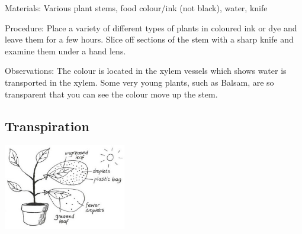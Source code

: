 \begin{multicols}{2}
\begin{description*}
\item[Materials:]{Various plant stems, food colour/ink (not black), water, knife}
\item[Procedure:]{Place a variety of different types of plants in coloured ink or dye and
leave them for a few hours. Slice off sections of the stem with a sharp
knife and examine them under a hand lens. }
\item[Observations:]{The colour is located in the
xylem vessels which shows water is transported in the xylem. Some very young plants, such as
Balsam, are so transparent that
you can see the colour move up
the stem.}
\end{description*}

\subsection{Transpiration}  %

\begin{center}
\includegraphics[width=0.4\textwidth]{./img/vso/transpiration.jpg}
\end{center}


\end{multicols}
